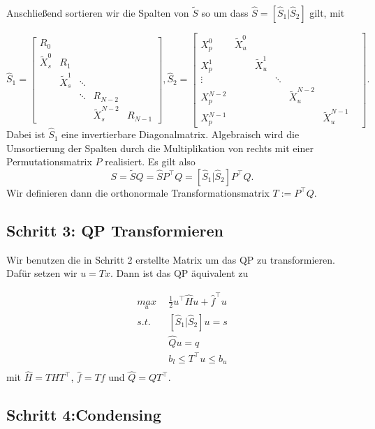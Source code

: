 Anschließend sortieren wir die Spalten von $\tilde{S}$ so um dass $\hat{S}=\left[\hat{S}_1 \vert \hat{S}_2 \right]$ gilt, mit

$$\hat{S}_1=\left[\begin{array}{ccccccc}
R_0 &  &  &  &      \\
\tilde{X}_s^0 & R_1   &  &  &   \\
 & \tilde{X}^1_s  & \ddots &  & \\
   &  &   \ddots & R_{N-2} &   \\
 &  &    & \tilde{X}^{N-2}_s & R_{N-1}    
\end{array} \right],
\hat{S}_2=
\left[ \begin{array}{ccccccc}
X_p^0 & \tilde{X}^0_u &  &  &  & &  \\ 
 X_p^1 &  & \tilde{X}^1_u &  &    &  \\ 
 \vdots &  &    & \ddots &    \\ 
 X_p^{N-2} &    &  &  & \tilde{X}^{N-2}_u &  \\ 
 X_p^{N-1} &    &  &  &  & \tilde{X}^{N-1}_u
\end{array} \right].
$$
Dabei ist $\hat{S}_1$ eine invertierbare Diagonalmatrix. Algebraisch wird die Umsortierung der Spalten durch die Multiplikation von rechts mit einer Permutationsmatrix $P$ realisiert. Es gilt also 
$$S=\tilde{S}Q=\hat{S}P^\top Q=\left[\hat{S}_1 \vert \hat{S}_2 \right]P^\top Q.$$ Wir definieren dann die orthonormale Transformationsmatrix $T:=P^\top Q$.


\subsection*{Schritt 3: QP Transformieren}

Wir benutzen die in Schritt 2 erstellte Matrix um das QP zu transformieren. Dafür setzen wir $u=Tx$. Dann ist das QP äquivalent zu 

\begin{align*}
\underset{u}{max} \ \ 	& \frac{1}{2}	u^\top \hat{H} u+\hat{f}^\top u \\
s.t. \ \ 				& \left[\hat{S}_1 \vert \hat{S}_2 \right]u=s \\
						& \hat{Q} u =q \\
						& b_l \leq T^\top u \leq b_u \\ 
\end{align*}
mit $\hat{H}=T H T^\top$, $\hat{f}=Tf$ und $\hat{Q}=QT^\top$.


\subsection*{Schritt 4:Condensing}

